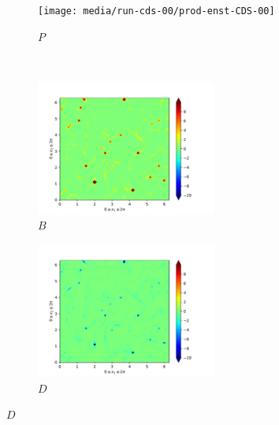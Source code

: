 \begin{figure}[H]
\begin{subfigure}{0.45\textwidth}
        \texttt{[image: media/run-cds-00/prod-enst-CDS-00]}
        \caption{$P$}
    \end{subfigure}
    ~
    \begin{subfigure}{0.45\textwidth}
        \includegraphics[height=1.75in]{media/run-cds-00/B-enst-CDS-00}
        \caption{$B$}
    \end{subfigure}
    \newline
    \begin{subfigure}{0.45\textwidth}
        \includegraphics[height=1.75in]{media/run-cds-00/D-enst-CDS-00}
        \caption{$D$}
    \end{subfigure}
\end{figure}
